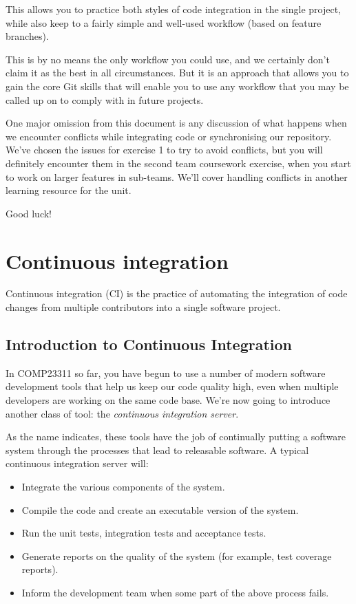 \documentclass[
]{book}
\providecommand{\tightlist}{%
  \setlength{\itemsep}{0pt}\setlength{\parskip}{0pt}}
\begin{document}
This allows you to practice both styles of code integration in the single project, while also keep to a fairly simple and well-used workflow (based on feature branches).

This is by no means the only workflow you could use, and we certainly don't claim it as the best in all circumstances. But it is an approach that allows you to gain the core Git skills that will enable you to use any workflow that you may be called up on to comply with in future projects.

One major omission from this document is any discussion of what happens when we encounter conflicts while integrating code or synchronising our repository. We've chosen the issues for exercise 1 to try to avoid conflicts, but you will definitely encounter them in the second team coursework exercise, when you start to work on larger features in sub-teams. We'll cover handling conflicts in another learning resource for the unit.

Good luck!

\hypertarget{integrating}{%
\chapter{Continuous integration}\label{integrating}}

Continuous integration (CI) is the practice of automating the integration of code changes from multiple contributors into a single software project.

\hypertarget{ici}{%
\section{Introduction to Continuous Integration}\label{ici}}

In COMP23311 so far, you have begun to use a number of modern software development tools that help us keep our code quality high, even when multiple developers are working on the same code base. We're now going to introduce another class of tool: the \emph{continuous integration server}.

As the name indicates, these tools have the job of continually putting a software system through the processes that lead to releasable software. A typical continuous integration server will:

\begin{itemize}
\tightlist
\item
  Integrate the various components of the system.
\item
  Compile the code and create an executable version of the system.
\item
  Run the unit tests, integration tests and acceptance tests.
\item
  Generate reports on the quality of the system (for example, test coverage reports).
\item
  Inform the development team when some part of the above process fails.
\end{itemize}
\end{document}
